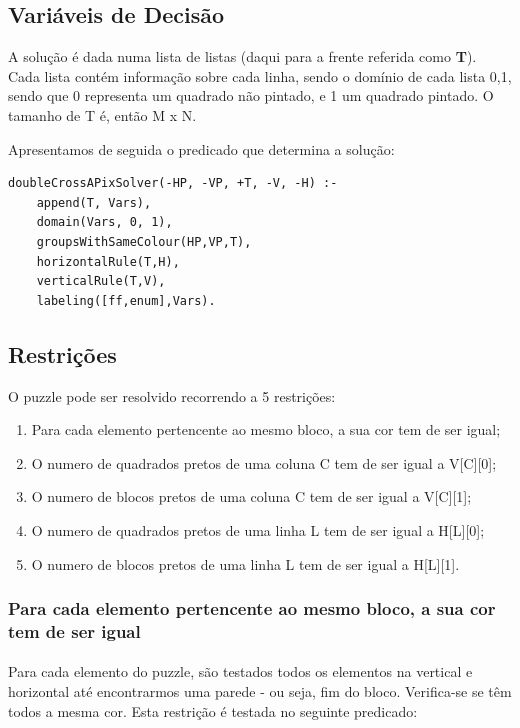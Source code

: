 \documentclass[runningheads,a4paper]{llncs}
\begin{document}
\subsection{Variáveis de Decisão}

A solução é dada numa lista de listas (daqui para a frente referida como \textbf{T}). Cada lista contém informação sobre cada linha, sendo o domínio de cada lista {0,1}, sendo que 0 representa um quadrado não pintado, e 1 um quadrado pintado. O tamanho de T é, então M x N.

Apresentamos de seguida o predicado que determina a solução:

\begin{lstlisting}
doubleCrossAPixSolver(-HP, -VP, +T, -V, -H) :-	
	append(T, Vars),
	domain(Vars, 0, 1),
	groupsWithSameColour(HP,VP,T),
	horizontalRule(T,H),
	verticalRule(T,V),
	labeling([ff,enum],Vars).
\end{lstlisting}

\subsection{Restrições}

O puzzle pode ser resolvido recorrendo a 5 restrições:

\begin{enumerate}
\item Para cada elemento pertencente ao mesmo bloco, a sua cor tem de ser igual;
\item O numero de quadrados pretos de uma coluna C tem de ser igual a V[C][0];
\item O numero de blocos pretos de uma coluna C tem de ser igual a V[C][1];
\item O numero de quadrados pretos de uma linha L tem de ser igual a H[L][0];
\item O numero de blocos pretos de uma linha L tem de ser igual a H[L][1].
\end{enumerate}

\subsubsection{Para cada elemento pertencente ao mesmo bloco, a sua cor tem de ser igual}
\paragraph{}
Para cada elemento do puzzle, são testados todos os elementos na vertical e horizontal até encontrarmos uma parede - ou seja, fim do bloco. Verifica-se se têm todos a mesma cor.
Esta restrição é testada no seguinte predicado:
\end{document}
